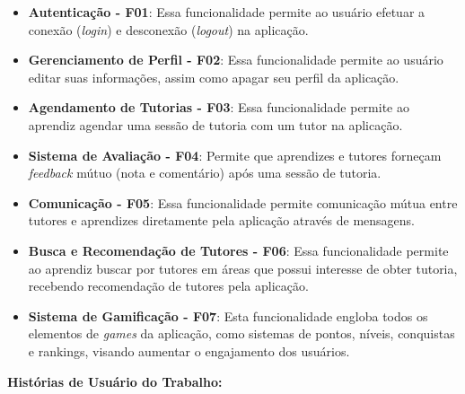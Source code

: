 \begin{itemize}
\item \textbf{Autenticação - F01}: Essa funcionalidade permite ao usuário efetuar a conexão (\textit{login}) e desconexão (\textit{logout}) na aplicação.

\item \textbf{Gerenciamento de Perfil - F02}: Essa funcionalidade permite ao usuário editar suas informações, assim como apagar seu perfil da aplicação.

\item \textbf{Agendamento de Tutorias - F03}: Essa funcionalidade permite ao aprendiz agendar uma sessão de tutoria com um tutor na aplicação.

\item \textbf{Sistema de Avaliação - F04}: Permite que aprendizes e tutores forneçam \textit{feedback} mútuo (nota e comentário) após uma sessão de tutoria.

\item \textbf{Comunicação - F05}: Essa funcionalidade permite comunicação mútua entre tutores e aprendizes diretamente pela aplicação através de mensagens.

\item \textbf{Busca e Recomendação de Tutores - F06}: Essa funcionalidade permite ao aprendiz buscar por tutores em áreas que possui interesse de obter tutoria, recebendo recomendação de tutores pela aplicação.

\item \textbf{Sistema de Gamificação - F07}: Esta funcionalidade engloba todos os elementos de \textit{games} da aplicação, como sistemas de pontos, níveis, conquistas e rankings, visando aumentar o engajamento dos usuários.

\end{itemize}

\textbf{Histórias de Usuário do Trabalho:}

